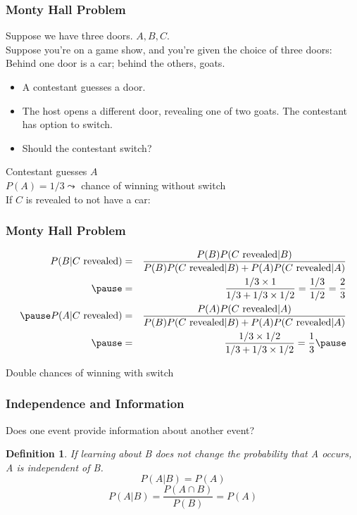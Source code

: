 \documentclass[handout]{beamer}
\newtheorem{defn}{Definition}
\numberwithin{equation}{section}
\begin{document}
\begin{frame}
\frametitle{Monty Hall Problem}

Suppose we have three doors.  $A, B, C$.  \pause \\
Suppose you're on a game show, and you're given the choice of three doors: Behind one door is a car; behind the others, goats. \\ \pause 
\begin{itemize}
\item[-] A contestant guesses a door. \pause 
\item[-] The host opens a different door, revealing one of two goats. The contestant has option to switch. \pause 
\item[-] Should the contestant switch? \pause 
\end{itemize}

Contestant guesses $A$\\ \pause 
$P(A) = 1/3 \leadsto$ chance of winning without switch\\\pause 
If $C$ is revealed to not have a car:\\ \pause 



\end{frame}


\begin{frame}
\frametitle{Monty Hall Problem}

\pause 
\begin{eqnarray}
P(B| C \text{ revealed} ) & = & \frac{P(B)P(C \text{ revealed} | B)}{P(B)P(C \text{ revealed} | B) + P(A) P(C \text{ revealed} | A) } \nonumber \\ \pause 
& = & \frac{1/3 \times 1}{1/3 + 1/3 \times 1/2 } = \frac{1/3}{1/2} = \frac{2}{3}\nonumber \\ \pause 
P(A| C \text{ revealed} ) & = & \frac{P(A) P(C \text{ revealed} | A)}{ P(B)P(C \text{ revealed} | B) + P(A) P(C \text{ revealed} | A) }\nonumber \\ \pause 
& = & \frac{1/3 \times 1/2}{1/3 + 1/3 \times 1/2} = \frac{1}{3} \nonumber  \pause 
\end{eqnarray}

\alert{Double chances of winning with switch}


\end{frame}





\begin{frame}
\frametitle{Independence and Information} 

Does one event provide \alert{information} about another event? \pause 

\begin{defn} 
If learning about B does not change the probability that A occurs, A is independent of B.
 $$P(A|B)=P(A)$$\pause
 $$P(A|B)=\frac{P(A\cap B)}{P(B)}=P(A)$$
\end{defn}
\pause


\end{frame}
\end{document}
